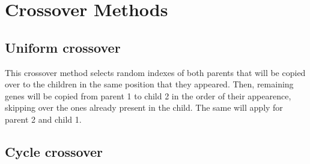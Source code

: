 \section{Crossover Methods}

\subsection{Uniform crossover}

This crossover method selects random indexes of both parents that will be copied over to the children in the same position that they appeared. Then, remaining genes will be copied from parent 1 to child 2 in the order of their appearence, skipping over the ones already present in the child. The same will apply for parent 2 and child 1.

\subsection{Cycle crossover}